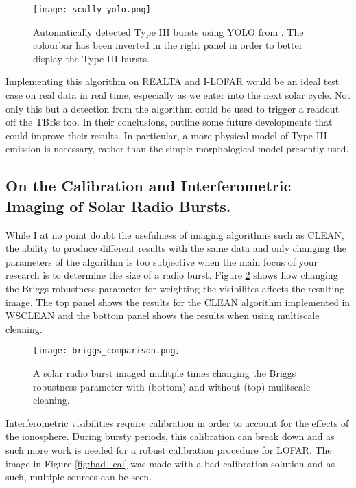 \begin{figure}[ht]
\centering
\texttt{[image: scully\_yolo.png]}
\caption[Automatically detected Type III bursts using YOLO]{Automatically detected Type III bursts using YOLO from \cite{Scully2021}. The colourbar has been inverted in the right panel in order to better display the Type III bursts. }
\label{fig:yolo}
\end{figure}

Implementing this algorithm on REALTA and I-LOFAR would be an ideal test case on real data in real time, especially as we enter into the next solar cycle. Not only this but a detection from the algorithm could be used to trigger a readout off the TBBs too.
In their conclusions, \cite{Scully2021} outline some future developments that could improve their results. In particular, a more physical model of Type III emission is necessary, rather than the simple morphological model presently used.

\subsection{On the Calibration and Interferometric Imaging of Solar Radio Bursts.}
While I at no point doubt the usefulness of imaging algorithms such as CLEAN, the ability to produce different results with the same data and only changing the parameters of the algorithm is too subjective when the main focus of your research is to determine the size of a radio burst. Figure \ref{fig:briggs_comparison} shows how changing the Briggs robustness parameter for weighting the visibilites affects the resulting image. The top panel shows the results for the CLEAN algorithm implemented in WSCLEAN and the bottom panel shows the results when using multiscale cleaning.

\begin{figure}[ht]
\centering
\texttt{[image: briggs\_comparison.png]}
\caption[An example of the same solar radio burst imaged with different weighting parameters.]{A solar radio burst imaged mulitple times changing the Briggs robustness parameter with (bottom) and without (top) mulitscale cleaning.}
\label{fig:briggs_comparison}
\end{figure}

Interferometric visibilities require calibration in order to account for the effects of the ionosphere. During bursty periods, this calibration can break down and as such more work is needed for a robust calibration procedure for LOFAR. The image in Figure \ref{fig:bad_cal} was made with a bad calibration solution and as such, multiple sources can be seen.

